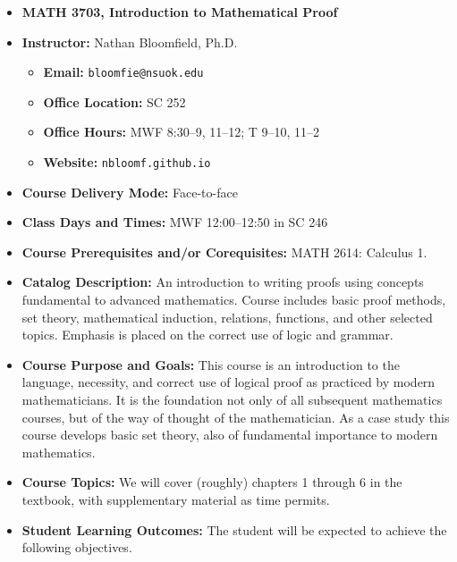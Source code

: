 \documentclass{article}
\begin{document}
\begin{itemize}
\item[] \textbf{\Large MATH 3703, Introduction to Mathematical Proof}

\item \textbf{Instructor:} Nathan Bloomfield, Ph.D.
\begin{itemize}
\item[] \textbf{Email:} \texttt{bloomfie@nsuok.edu}
\item[] \textbf{Office Location:} SC 252 
\item[] \textbf{Office Hours:} MWF 8:30--9, 11--12; T 9--10, 11--2
\item[] \textbf{Website:} \texttt{nbloomf.github.io}
\end{itemize}


\item \textbf{Course Delivery Mode:} Face-to-face


\item \textbf{Class Days and Times:} MWF 12:00--12:50 in SC 246


\item \textbf{Course Prerequisites and/or Corequisites:} MATH 2614: Calculus 1.


\item \textbf{Catalog Description:} An introduction to writing proofs using concepts fundamental to advanced mathematics. Course includes basic proof methods, set theory, mathematical induction, relations, functions, and other selected topics.  Emphasis is placed on the correct use of logic and grammar.


\item \textbf{Course Purpose and Goals:} This course is an introduction to the language, necessity, and correct use of logical proof as practiced by modern mathematicians. It is the foundation not only of all subsequent mathematics courses, but of the way of thought of the mathematician. As a case study this course develops basic set theory, also of fundamental importance to modern mathematics.


\item \textbf{Course Topics:} We will cover (roughly) chapters 1 through 6 in the textbook, with supplementary material as time permits.


\item \textbf{Student Learning Outcomes:} The student will be expected to achieve the following objectives.



\end{itemize}
\end{document}
